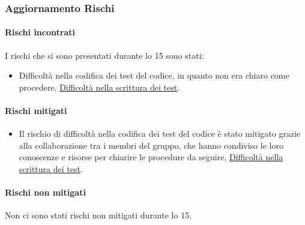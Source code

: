 \subsubsection{Aggiornamento Rischi}
\label{sec:aggiornamento_rischi_sprint15}

\paragraph{Rischi incontrati}
\label{par:rischi_incontrati_sprint15}
I rischi che si sono presentati durante lo  15 sono stati:
\begin{itemize}
    \item Difficoltà nella codifica dei test del codice, in quanto non era chiaro come procedere, \hyperref[rischio:RT5]{Difficoltà nella scrittura dei test}.
\end{itemize}

\paragraph{Rischi mitigati}
\label{par:rischi_mitigati_sprint15}
\begin{itemize}
    \item Il rischio di difficoltà nella codifica dei test del codice è stato mitigato grazie alla collaborazione tra i membri del gruppo, che hanno condiviso le loro conoscenze e risorse per chiarire le procedure da seguire, \hyperref[rischio:RT5]{Difficoltà nella scrittura dei test}.
\end{itemize}

\paragraph{Rischi non mitigati}
\label{par:rischi_non_mitigati_sprint15}
Non ci sono stati rischi non mitigati durante lo  15.